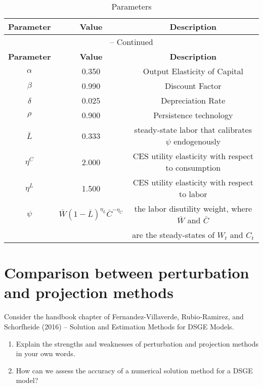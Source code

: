 \documentclass{article}
\begin{document}
\begin{center}
\begin{longtable}{ccc}
\caption{Parameters}\label{tbl:RBC.Parameters}\\%
\toprule%
\multicolumn{1}{c}{\textbf{Parameter}} &
\multicolumn{1}{c}{\textbf{Value}} &
\multicolumn{1}{c}{\textbf{Description}}\\%
\midrule%
\endfirsthead%
\multicolumn{3}{c}{{\tablename} \thetable{} {--} Continued}\\%
\midrule%
\multicolumn{1}{c}{\textbf{Parameter}} &
\multicolumn{1}{c}{\textbf{Value}} &
\multicolumn{1}{c}{\textbf{Description}}\\%
\midrule%
\endhead%
\({\alpha}\) 	 & 	 0.350 	 & 	 Output Elasticity of Capital\\
\({\beta}\) 	 & 	 0.990 	 & 	 Discount Factor\\
\({\delta}\) 	 & 	 0.025 	 & 	 Depreciation Rate\\
\({\rho}\) 	   & 	 0.900 	 & 	 Persistence technology\\
\({\bar{L}}\)  & 	 0.333 	 & 	 steady-state labor that calibrates \(\psi \) endogenously\\
\({\eta^C}\) 	 & 	 2.000 	 & 	 CES utility elasticity with respect to consumption\\
\({\eta^L}\) 	 & 	 1.500 	 & 	 CES utility elasticity with respect to labor\\
\({\psi}\) 	   & 	 \(\bar{W}{(1-\bar{L})}^{\eta_L} \bar{C}^{-\eta_C}\) 	 & 	the labor disutility weight, where \(\bar{W}\) and \(\bar{C}\) \\
               &           &are the steady-states of \(W_t\) and \(C_t\)
\\
\bottomrule%
\end{longtable}
\end{center}

\newpage

\section{Comparison between perturbation and projection methods}
Consider the handbook chapter of Fernandez-Villaverde, Rubio-Ramirez, and Schorfheide (2016) {--} Solution and Estimation Methods for DSGE Models.

\begin{enumerate}
\item
Explain the strengths and weaknesses of perturbation and projection methods in your own words.

\item
How can we assess the accuracy of a numerical solution method for a DSGE model?
\end{enumerate}
\end{document}
